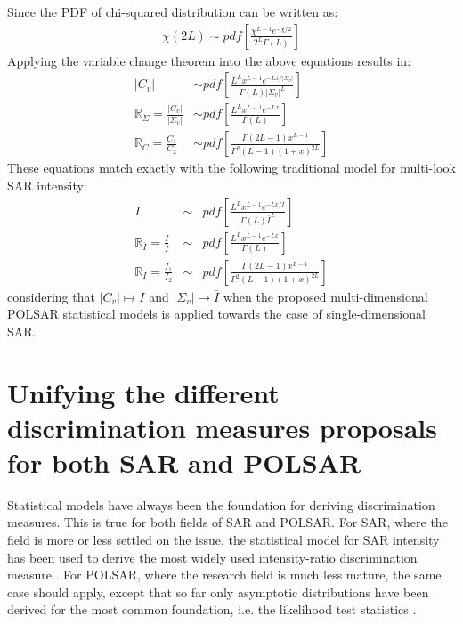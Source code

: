 \documentclass[journal]{IEEEtran}
\begin{document}
Since the PDF of chi-squared distribution can be written as:
\begin{align*}
\chi(2L) \sim pdf \left[ \frac{\chi^{L-1}e^{-\chi/2}}{2^L\Gamma(L)} \right]
\end{align*}
Applying the variable change theorem into the above equations results in:
\begin{align*}
  |C_v| &\sim  pdf \left[ \frac{L^L x^{L-1} e^{-Lx/|\Sigma_v|}}{\Gamma(L) |\Sigma_v|^L} \right] \\ %
  \mathbb{R}_{\Sigma} = \frac{|C_v|}{|\Sigma_v|} &\sim pdf \left[ \frac{ L^{L} x^{L-1} e^{-Lx}}{ \Gamma(L)} \right] \\ %
  \mathbb{R}_{C} = \frac{C_1}{C_2} &\sim pdf \left[ \frac{\Gamma(2L-1) x^{L-1}}{\Gamma^2(L-1) (1+x)^{2L}} \right]
\end{align*}
These equations match exactly with the following traditional model for multi-look SAR intensity:
  \begin{eqnarray}
I &\sim& pdf \left[ \frac{L^L x^{L-1} e^{-Lx/\bar{I}}}{\Gamma(L) \bar{I}^L} \right] \\
\mathbb{R}_{\bar{I}} = \frac{I}{\bar{I}} &\sim& pdf \left[ \frac{ L^{L} x^{L-1} e^{-Lx}}{ \Gamma(L)} \label{eqn:multi_look_SAR_ratio_dist} \right] \\
  \mathbb{R}_{I} = \frac{I_1}{I_2} &\sim& pdf \left[ \frac{\Gamma(2L-1) x^{L-1}}{\Gamma^2(L-1) (1+x)^{2L}} \right]
  \end{eqnarray}
considering that $|C_v| \mapsto I$ and $|\Sigma_v| \mapsto \bar{I}$ when the proposed multi-dimensional POLSAR statistical models is applied towards the case of single-dimensional SAR.

\section{Unifying the different discrimination measures proposals for both SAR and POLSAR}
\label{sec:link_sar_polsar}

Statistical models have always been the foundation for deriving discrimination measures.
This is true for both fields of SAR and POLSAR.
For SAR, where the field is more or less settled on the issue,
  the statistical model for SAR intensity has been used to derive the most widely used intensity-ratio discrimination measure \cite{Rignot_1993_TGRS_896}.
For POLSAR, where the research field is much less mature,
  the same case should apply, 
  except that so far only asymptotic distributions have been derived for the most common foundation, i.e. the likelihood test statistics \cite{Conradsen_2003_TGRS_4}.
\end{document}
